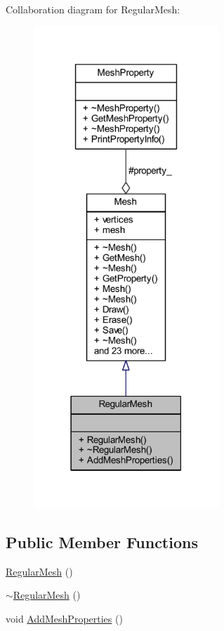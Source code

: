 Collaboration diagram for Regular\+Mesh\+:\nopagebreak
\begin{figure}[H]
\begin{center}
\leavevmode
\includegraphics[width=197pt]{class_regular_mesh__coll__graph}
\end{center}
\end{figure}
\subsection*{Public Member Functions}
\begin{DoxyCompactItemize}
\item 
\mbox{\hyperlink{class_regular_mesh_a96ec7f2ab73178638c6887b8a37735ac}{Regular\+Mesh}} ()
\item 
\mbox{\hyperlink{class_regular_mesh_aca610c9b242297893cdc2dc2f427b89e}{$\sim$\+Regular\+Mesh}} ()
\item 
void \mbox{\hyperlink{class_regular_mesh_a1f24f9c533797074ade33aee4e97cfb6}{Add\+Mesh\+Properties}} ()
\end{DoxyCompactItemize}
